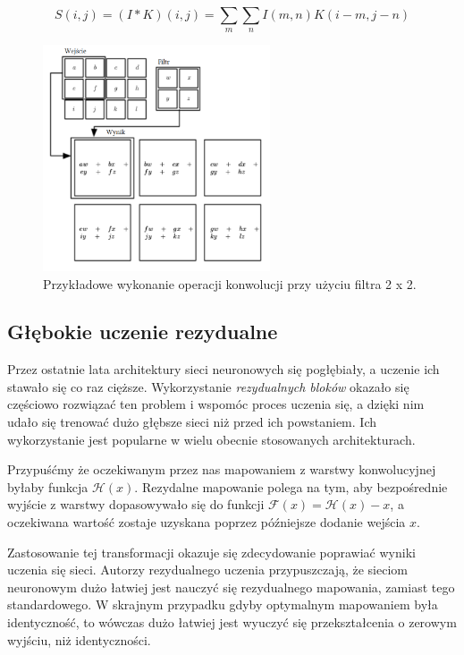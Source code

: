 \documentclass[licencjacka]{pracamgr}
\begin{document}
$$ S(i, j) = (I * K)(i, j) = \sum_m \sum_n I(m, n) K(i - m, j - n) $$


\begin{figure}[ht!]
  \centering
  \includegraphics[width=0.6\textwidth]{konwolucja}
  \caption{Przykładowe wykonanie operacji konwolucji przy użyciu filtra 2 x 2. \cite{dlbook}}
\end{figure}

\subsection{Głębokie uczenie rezydualne}

Przez ostatnie lata architektury sieci neuronowych się pogłębiały, a uczenie ich stawało się co raz cięższe. Wykorzystanie \emph{rezydualnych bloków} \cite{resnet} okazało się częściowo rozwiązać ten problem i wspomóc proces uczenia się, a dzięki nim udało się trenować dużo głębsze sieci niż przed ich powstaniem. Ich wykorzystanie jest popularne w wielu obecnie stosowanych architekturach.

Przypuśćmy że oczekiwanym przez nas mapowaniem z warstwy konwolucyjnej byłaby funkcja $ \mathcal{H}(x) $. Rezydalne mapowanie polega na tym, aby bezpośrednie wyjście z warstwy dopasowywało się do funkcji $ \mathcal{F}(x) = \mathcal{H}(x) - x $, a oczekiwana wartość zostaje uzyskana poprzez późniejsze dodanie wejścia $x$. 

Zastosowanie tej transformacji okazuje się zdecydowanie poprawiać wyniki uczenia się sieci. Autorzy rezydualnego uczenia przypuszczają, że sieciom neuronowym dużo łatwiej jest nauczyć się rezydualnego mapowania, zamiast tego standardowego. W skrajnym przypadku gdyby optymalnym mapowaniem była identyczność, to wówczas dużo łatwiej jest wyuczyć się przekształcenia o zerowym wyjściu, niż identyczności.
\end{document}
